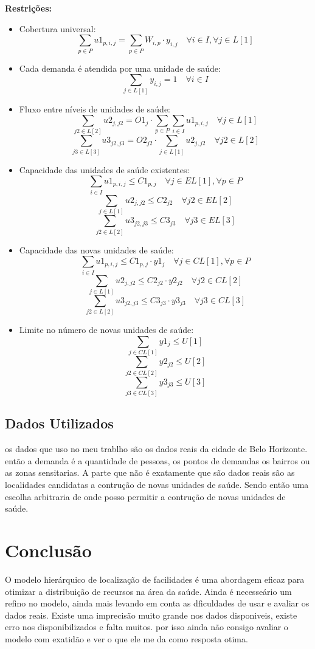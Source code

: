 \documentclass[a4paper,12pt]{article}
\begin{document}
\textbf{Restrições:}
\begin{itemize}
    \item Cobertura universal:
    \[
    \sum_{p \in P} u1_{p,i,j} = \sum_{p \in P} W_{i,p} \cdot y_{i,j} \quad \forall i \in I, \forall j \in L[1]
    \]
    \item Cada demanda é atendida por uma unidade de saúde:
    \[
    \sum_{j \in L[1]} y_{i,j} = 1 \quad \forall i \in I
    \]
    \item Fluxo entre níveis de unidades de saúde:
    \[
    \sum_{j2 \in L[2]} u2_{j,j2} = O1_{j} \cdot \sum_{p \in P} \sum_{i \in I} u1_{p,i,j} \quad \forall j \in L[1]
    \]
    \[
    \sum_{j3 \in L[3]} u3_{j2,j3} = O2_{j2} \cdot \sum_{j \in L[1]} u2_{j,j2} \quad \forall j2 \in L[2]
    \]
    \item Capacidade das unidades de saúde existentes:
    \[
    \sum_{i \in I} u1_{p,i,j} \leq C1_{p,j} \quad \forall j \in EL[1], \forall p \in P
    \]
    \[
    \sum_{j \in L[1]} u2_{j,j2} \leq C2_{j2} \quad \forall j2 \in EL[2]
    \]
    \[
    \sum_{j2 \in L[2]} u3_{j2,j3} \leq C3_{j3} \quad \forall j3 \in EL[3]
    \]
    \item Capacidade das novas unidades de saúde:
    \[
    \sum_{i \in I} u1_{p,i,j} \leq C1_{p,j} \cdot y1_{j} \quad \forall j \in CL[1], \forall p \in P
    \]
    \[
    \sum_{j \in L[1]} u2_{j,j2} \leq C2_{j2} \cdot y2_{j2} \quad \forall j2 \in CL[2]
    \]
    \[
    \sum_{j2 \in L[2]} u3_{j2,j3} \leq C3_{j3} \cdot y3_{j3} \quad \forall j3 \in CL[3]
    \]
    \item Limite no número de novas unidades de saúde:
    \[
    \sum_{j \in CL[1]} y1_{j} \leq U[1]
    \]
    \[
    \sum_{j2 \in CL[2]} y2_{j2} \leq U[2]
    \]
    \[
    \sum_{j3 \in CL[3]} y3_{j3} \leq U[3]
    \]
\end{itemize}

\subsection{Dados Utilizados}
os dados que uso no meu trablho são os dados reais da cidade de Belo Horizonte.
então a demanda é a quantidade de pessoas, os pontos de demandas os bairros ou as zonas sensitarias.
A parte que não é exatamente que são dados reais são as localidades candidatas a contrução de novas unidades de saúde.
Sendo então uma escolha arbitraria de onde posso permitir a contrução de novas unidades de saúde.

\section{Conclusão}

O modelo hierárquico de localização de facilidades é uma abordagem eficaz para otimizar a distribuição de recursos na área da saúde.
Ainda é necesseário um refino no modelo, ainda mais levando em conta as dficuldades de usar e avaliar os dados reais.
Existe uma imprecisão muito grande nos dados disponiveis, existe erro nos disponibilizados e falta muitos. 
por isso ainda não consigo avaliar o modelo com exatidão e ver o que ele me da como resposta otima.
\end{document}
